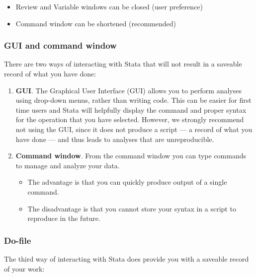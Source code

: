 \documentclass[
]{book}
\providecommand{\tightlist}{%
  \setlength{\itemsep}{0pt}\setlength{\parskip}{0pt}}
\begin{document}
\begin{itemize}
\tightlist
\item
  Review and Variable windows can be closed (user preference)
\item
  Command window can be shortened (recommended)
\end{itemize}

\hypertarget{gui-and-command-window}{%
\subsubsection{GUI and command window}\label{gui-and-command-window}}

There are two ways of interacting with Stata that will not result in a saveable record of what you have done:

\begin{enumerate}
\def\labelenumi{\arabic{enumi}.}
\item
  \textbf{GUI}. The Graphical User Interface (GUI) allows you to perform analyses using drop-down menus, rather than writing code. This can be easier for first time users and Stata will helpfully display the command and proper syntax for the operation that you have selected. However, we strongly recommend not using the GUI, since it does not produce a script --- a record of what you have done --- and thus leads to analyses that are unreproducible.
\item
  \textbf{Command window}. From the command window you can type commands to manage and analyze your data.

  \begin{itemize}
  \tightlist
  \item
    The advantage is that you can quickly produce output of a single command.
  \item
    The disadvantage is that you cannot store your syntax in a script to reproduce in the future.
  \end{itemize}
\end{enumerate}

\hypertarget{do-file}{%
\subsubsection{Do-file}\label{do-file}}

The third way of interacting with Stata does provide you with a saveable record of your work:
\end{document}
